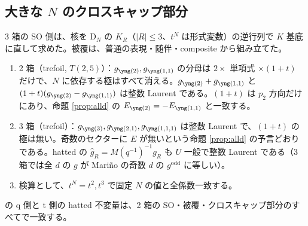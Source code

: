 \subsection{大きな $N$ のクロスキャップ部分}
3 箱の SO 側は、核を D$_N$ の $K_R$（$|R| \le 3$、$t^N$ は形式変数）の逆行列で $K$ 基底に直して求めた。被覆は、普通の表現・随伴・composite から組み立てた。
\begin{compresult}\label{cr:largeN}
\begin{enumerate}
\item 2 箱（trefoil, $T(2,5)$）：$g_{\ytwo}, g_{\yoneone}$ の分母は $2\times$ 単項式 $\times(1+t)$ だけで、$N$ に依存する極はすべて消える。$g_{\ytwo} + g_{\yoneone}$ と $(1+t)(g_{\ytwo} - g_{\yoneone})$ は整数 Laurent である。$(1+t)$ は $p_2$ 方向だけにあり、命題 \ref{prop:alld} の $E_{\ytwo} = -E_{\yoneone}$ と一致する。
\item 3 箱（trefoil）：$g_{\ythree}, g_{\ytwoone}, g_{\yoneoneone}$ は整数 Laurent で、$(1+t)$ の極は無い。奇数のセクターに $E$ が無いという命題 \ref{prop:alld} の予言どおりである。hatted の $\hat g_R = M(q^{-1})^{-1} g_R$ も $U$ 一般で整数 Laurent である（3 箱では全 $d$ の $g$ が Mariño の奇数 $d$ の $g^{\mathrm{odd}}$ に等しい）。
\item 検算として、$t^N = t^2, t^3$ で固定 $N$ の値と全係数一致する。
\end{enumerate}
\end{compresult}

\cite{KN17} の q 側と t 側の hatted 不変量は、2 箱の SO・被覆・クロスキャップ部分のすべてで一致する。

